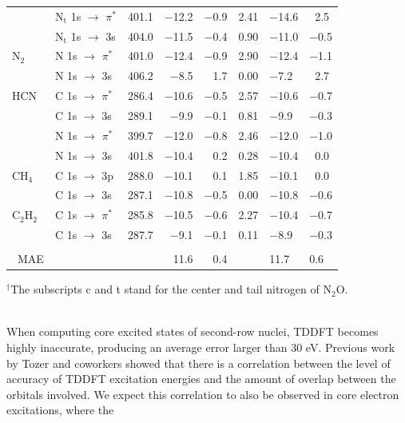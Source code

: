 \documentclass[12pt]{article}
\begin{document}
\begin{table}[!ht]
\begin{center}
\begin{tabular*}{12.5cm}{@{\extracolsep{\fill} }llcrrcHH}
    ~         & N$_\text{t}$ 1s $\rightarrow$ $\pi^*$ & 401.1 & $-$12.2     & $-$0.9 & 2.41 & $-$14.6    & \ 2.5   \\
    ~         & N$_\text{t}$ 1s $\rightarrow$ 3s      & 404.0   & $-$11.5    & $-$0.4 & 0.90   & $-$11.0    & $-$0.5  \\
    N$_2$         &N 1s  $\rightarrow$ $\pi^*$ & 401.0 & $-$12.4 & $-$0.9 & 2.90 & $-$12.4 & $-$1.1 \\
    ~         & N 1s  $\rightarrow$ 3s & 406.2 & $-$8.5 & 1.7 & 0.00  & $-$7.2 & \ 2.7\\ 
    HCN       & C 1s $\rightarrow$ $\pi^*$     & 286.4 & $-$10.6     & $-$0.5 & 2.57  & $-$10.6    & $-$0.7  \\
    ~         & C 1s $\rightarrow$ 3s          & 289.1 & $-$9.9      & $-$0.1 & 0.81   & $-$9.9    & $-$0.3  \\
    ~         & N 1s $\rightarrow$  $\pi^*$    & 399.7 & $-$12.0     & $-$0.8 & 2.46  & $-$12.0    & $-$1.0  \\
    ~         & N 1s $\rightarrow$ 3s          & 401.8 & $-$10.4      & \ 0.2 & 0.28    & $-$10.4    & \ 0.0  \\
    CH$_4$      & C 1s $\rightarrow$ 3p          & 288.0   & $-$10.1      & \ 0.1 & 1.85   & $-$10.1    & \ 0.0   \\
    ~         & C 1s $\rightarrow$ 3s          & 287.1 & $-$10.8    & $-$0.5 & 0.00   & $-$10.8     & $-$0.6 \\ 
        C$_2$H$_2$      & C 1s $\rightarrow$ $\pi^*$           & 285.8   & $-$10.5      & $-$0.6 & 2.27   & $-$10.4   & $-$0.7  \\
    ~         & C 1s $\rightarrow$ 3s            & 287.7 & $-$9.1 & $-$0.1 & 0.11   & $-$8.9    & $-$0.3\\\\
    ~MAE         &                            & ~     & 11.6      & 0.4 &   & 11.7     & 0.6 \\ 
    \hline
    \hline
    \end{tabular*}
    
    $^{\dagger}$The subscripts c and t stand for the center and tail nitrogen of N$_2$O.
\end{center}
     \label{table:FirstRow}
     \end{table}
     \\
When computing core excited states of second-row nuclei, TDDFT becomes highly inaccurate, producing an average error larger than 30 eV. Previous work by Tozer and coworkers \cite{peach_excitation_2008}  showed that there is a correlation between the level of accuracy of TDDFT excitation energies and the amount of overlap between the orbitals involved. We expect this correlation to also be observed in core electron excitations, where the
\end{document}
